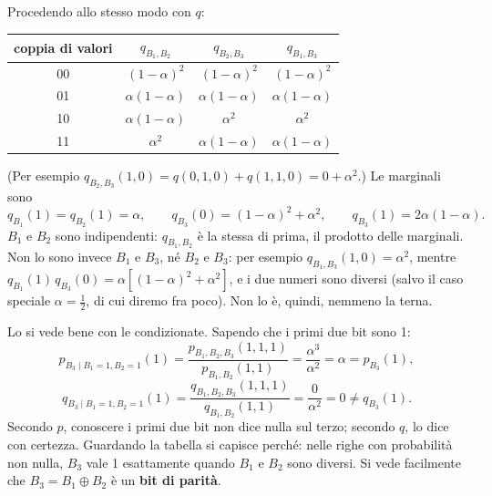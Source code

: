 Procedendo allo stesso modo con $q$:
\begin{center}
\renewcommand{\arraystretch}{1.3}
\begin{tabular}{@{}cccc@{}}
  \toprule
  coppia di valori & $q_{B_1,B_2}$ & $q_{B_2,B_3}$ & $q_{B_1,B_3}$ \\
  \midrule
  00 & $(1-\alpha)^2$ & $(1-\alpha)^2$ & $(1-\alpha)^2$ \\
  01 & $\alpha(1-\alpha)$ & $\alpha(1-\alpha)$ & $\alpha(1-\alpha)$ \\
  10 & $\alpha(1-\alpha)$ & $\alpha^2$ & $\alpha^2$ \\
  11 & $\alpha^2$ & $\alpha(1-\alpha)$ & $\alpha(1-\alpha)$ \\
  \bottomrule
\end{tabular}
\end{center}
(Per esempio $q_{B_2,B_3}(1, 0) = q(0, 1, 0) + q(1, 1, 0) = 0 + \alpha^2$.) Le marginali sono
\[
  q_{B_1}(1) = q_{B_2}(1) = \alpha , \qquad
  q_{B_3}(0) = (1-\alpha)^2 + \alpha^2 , \qquad q_{B_3}(1) = 2\alpha(1-\alpha) .
\]
$B_1$ e $B_2$ sono indipendenti: $q_{B_1,B_2}$ è la stessa di prima, il prodotto delle marginali. Non lo sono invece
$B_1$ e $B_3$, né $B_2$ e $B_3$: per esempio $q_{B_1,B_3}(1, 0) = \alpha^2$, mentre
$q_{B_1}(1)\, q_{B_3}(0) = \alpha \left[ (1-\alpha)^2 + \alpha^2 \right]$, e i due numeri sono diversi (salvo il caso
speciale $\alpha = \frac12$, di cui diremo fra poco). Non lo è, quindi, nemmeno la terna.

Lo si vede bene con le condizionate. Sapendo che i primi due bit sono 1:
\[
  p_{B_3 \mid B_1 = 1, B_2 = 1}(1) = \frac{p_{B_1,B_2,B_3}(1, 1, 1)}{p_{B_1,B_2}(1, 1)} = \frac{\alpha^3}{\alpha^2} =
  \alpha = p_{B_3}(1) ,
\]
\[
  q_{B_3 \mid B_1 = 1, B_2 = 1}(1) = \frac{q_{B_1,B_2,B_3}(1, 1, 1)}{q_{B_1,B_2}(1, 1)} = \frac{0}{\alpha^2} = 0 \neq
  q_{B_3}(1) .
\]
Secondo $p$, conoscere i primi due bit non dice nulla sul terzo; secondo $q$, lo dice con certezza. Guardando la
tabella si capisce perché: nelle righe con probabilità non nulla, $B_3$ vale 1 esattamente quando $B_1$ e $B_2$ sono
diversi. Si vede facilmente che $B_3 = B_1 \oplus B_2$ è un \textbf{bit di parità}.

